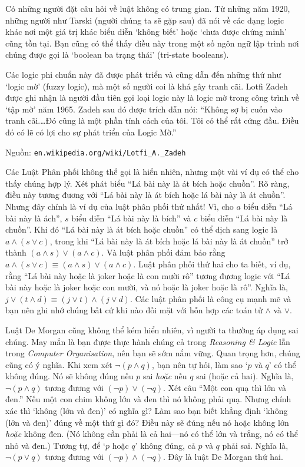 \begin{infobox}
Có những người đặt câu hỏi về luật không có trung gian. Từ những năm 1920, những người như Tarski (người chúng ta sẽ gặp sau) đã nói về các dạng logic khác nơi một giá trị khác biểu diễn `không biết' hoặc `chưa được chứng minh' cũng tồn tại. Bạn cũng có thể thấy điều này trong một số ngôn ngữ lập trình nơi chúng được gọi là `boolean ba trạng thái' (tri-state booleans).

Các logic phi chuẩn này đã được phát triển và cũng dẫn đến những thứ như `logic mờ' (fuzzy logic), mà một số người coi là khá gây tranh cãi. Lotfi Zadeh được ghi nhận là người đầu tiên gọi loại logic này là logic mờ trong công trình về `tập mờ' năm 1965. Zadeh sau đó được trích dẫn nói: ``Không sợ bị cuốn vào tranh cãi.\ldots Đó cũng là một phần tính cách của tôi. Tôi có thể rất cứng đầu. Điều đó có lẽ có lợi cho sự phát triển của Logic Mờ.''

Nguồn: \texttt{en.wikipedia.org/wiki/Lotfi\_A.\_Zadeh}
\end{infobox}

Các Luật Phân phối không thể gọi là hiển nhiên, nhưng một vài ví dụ có thể cho thấy chúng hợp lý. Xét phát biểu ``Lá bài này là át bích hoặc chuồn''. Rõ ràng, điều này tương đương với ``Lá bài này là át bích hoặc lá bài này là át chuồn''. Nhưng đây chính là ví dụ của luật phân phối thứ nhất! Vì, cho $a$ biểu diễn ``Lá bài này là ách'', $s$ biểu diễn ``Lá bài này là bích'' và $c$ biểu diễn ``Lá bài này là chuồn''. Khi đó ``Lá bài này là át bích hoặc chuồn'' có thể dịch sang logic là $a \land (s \lor c)$, trong khi ``Lá bài này là át bích hoặc lá bài này là át chuồn'' trở thành $(a \land s) \lor (a \land c)$. Và luật phân phối đảm bảo rằng $a \land (s \lor c) \equiv (a \land s) \lor (a \land c)$. Luật phân phối thứ hai cho ta biết, ví dụ, rằng ``Lá bài này hoặc là joker hoặc là con mười rô'' tương đương logic với ``Lá bài này hoặc là joker hoặc con mười, và nó hoặc là joker hoặc là rô''. Nghĩa là, $j \lor (t \land d) \equiv (j \lor t) \land (j \lor d)$. Các luật phân phối là công cụ mạnh mẽ và bạn nên ghi nhớ chúng bất cứ khi nào đối mặt với hỗn hợp các toán tử $\land$ và $\lor$.

Luật De Morgan cũng không thể kém hiển nhiên, vì người ta thường áp dụng sai chúng. May mắn là bạn được thực hành chúng cả trong \emph{Reasoning \& Logic} lẫn trong \emph{Computer Organisation}, nên bạn sẽ sớm nắm vững. Quan trọng hơn, chúng cũng có ý nghĩa. Khi xem xét $\lnot(p \land q)$, bạn nên tự hỏi, làm sao `$p$ và $q$' có thể không đúng. Nó sẽ không đúng nếu $p$ sai \emph{hoặc} nếu $q$ sai (hoặc cả hai). Nghĩa là, $\lnot(p \land q)$ tương đương với $(\lnot p) \lor (\lnot q)$. Xét câu ``Một con quạ thì lớn và đen.'' Nếu một con chim không lớn và đen thì nó không phải quạ. Nhưng chính xác thì `không (lớn và đen)' có nghĩa gì? Làm sao bạn biết khẳng định `không (lớn và đen)' đúng về một thứ gì đó? Điều này sẽ đúng nếu nó hoặc không lớn \emph{hoặc} không đen. (Nó không cần phải là cả hai---nó có thể lớn và trắng, nó có thể nhỏ và đen.) Tương tự, để `$p$ hoặc $q$' không đúng, cả $p$ và $q$ phải sai. Nghĩa là, $\lnot(p \lor q)$ tương đương với $(\lnot p) \land (\lnot q)$. Đây là luật De Morgan thứ hai.

